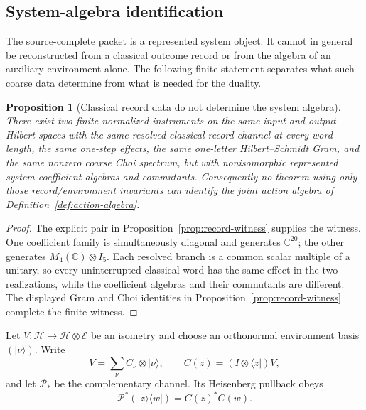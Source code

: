 \documentclass[11pt]{article}
\numberwithin{equation}{section}
\newtheorem{proposition}[theorem]{Proposition}
\theoremstyle{definition}
\theoremstyle{remark}
\newcommand{\C}{\mathbb C}
\newcommand{\Hh}{\mathcal H}
\begin{document}
\subsection{System-algebra identification}
\label{sec:source-identifiability}

The source-complete packet is a represented system object.  It cannot in
general be reconstructed from a classical outcome record or from the algebra
of an auxiliary environment alone.  The following finite statement separates
what such coarse data determine from what is needed for the duality.

\begin{proposition}[Classical record data do not determine the system algebra]
\label{thm:record-nonidentifiability}
There exist two finite normalized instruments on the same input and output
Hilbert spaces with the same resolved classical record channel at every word
length, the same one-step effects, the same one-letter Hilbert--Schmidt Gram,
and the same nonzero coarse Choi spectrum, but with nonisomorphic represented
system coefficient algebras and commutants.  Consequently no theorem using
only those record/environment invariants can identify the joint action algebra
of Definition~\ref{def:action-algebra}.
\end{proposition}

\begin{proof}
The explicit pair in Proposition~\ref{prop:record-witness} supplies the witness.
One coefficient family is simultaneously diagonal and generates
$\C^{20}$; the other generates $M_4(\C)\otimes I_5$.  Each resolved branch is
a common scalar multiple of a unitary, so every uninterrupted classical word
has the same effect in the two realizations, while the coefficient algebras
and their commutants are different.  The displayed Gram and Choi identities in
Proposition~\ref{prop:record-witness} complete the finite witness.
\end{proof}

Let $V:\Hh\to\Hh\otimes\mathcal E$ be an isometry and choose an orthonormal
environment basis $(|\nu\rangle)$.  Write
\[
 V=\sum_\nu C_\nu\otimes|\nu\rangle,
 \qquad
 C(z)=(I\otimes\langle z|)V,
\]
and let $\mathcal P_*$ be the complementary channel.  Its Heisenberg pullback
obeys
\begin{equation}
 \mathcal P^*(|z\rangle\langle w|)=C(z)^*C(w).
 \label{eq:complementary-pullback}
\end{equation}
\end{document}
